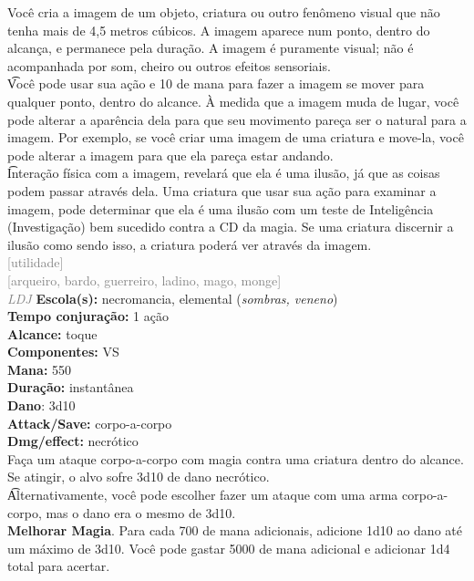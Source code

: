 \documentclass{RPG_Adventure}[2021/10/20]
\begin{document}
{\normalsize Você cria a imagem de um objeto, criatura ou outro fenômeno visual que não tenha mais de 4,5 metros cúbicos. A imagem aparece num ponto, dentro do alcança, e permanece pela duração. A imagem é puramente visual; não é acompanhada por som, cheiro ou outros efeitos sensoriais.\\\t Você pode usar sua ação e 10 de mana para fazer a imagem se mover para qualquer ponto, dentro do alcance. À medida que a imagem muda de lugar, você pode alterar a aparência dela para que seu movimento pareça ser o natural para a imagem. Por exemplo, se você criar uma imagem de uma criatura e move-la, você pode alterar a imagem para que ela pareça estar andando.\\\t Interação física com a imagem, revelará que ela é uma ilusão, já que as coisas podem passar através dela. Uma criatura que usar sua ação para examinar a imagem, pode determinar que ela é uma ilusão com um teste de Inteligência (Investigação) bem sucedido contra a CD da magia. Se uma criatura discernir a ilusão como sendo isso, a criatura poderá ver através da imagem.\\}
{\scriptsize \textcolor{gray}{[utilidade]\\}}
{\scriptsize \textcolor{gray}{[arqueiro, bardo, guerreiro, ladino, mago, monge]\\}}
{\tiny \textcolor{gray}{\textit{LDJ}}}\jump{}
{\small \t \textbf{Escola(s):} necromancia, elemental (\textit{sombras, veneno})\\\t \textbf{Tempo conjuração:} 1 ação\\\t \textbf{Alcance:} toque\\\t \textbf{Componentes:} VS\\\t \textbf{Mana:} 550\\\t \textbf{Duração:} instantânea\\\t \textbf{Dano}: 3d10\\\t \textbf{Attack/Save:} corpo-a-corpo\\\t \textbf{Dmg/effect:} necrótico\\}
{\normalsize Faça um ataque corpo-a-corpo com magia contra uma criatura dentro do alcance. Se atingir, o alvo sofre 3d10 de dano necrótico.\\\t Alternativamente, você pode escolher fazer um ataque com uma arma corpo-a-corpo, mas o dano era o mesmo de 3d10.\\\t \textbf{Melhorar Magia}. Para cada 700 de mana adicionais, adicione 1d10 ao dano até um máximo de 3d10. Você pode gastar 5000 de mana adicional e adicionar 1d4 total para acertar.\\}
\end{document}
